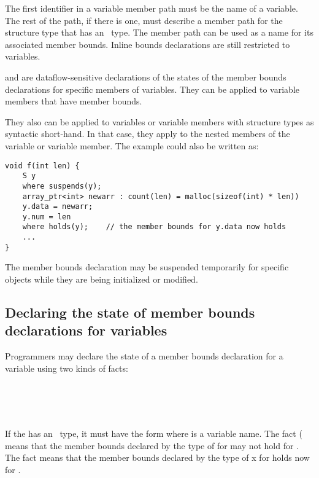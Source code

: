 The first identifier in a variable member path must be the name of a
variable. The rest of the path, if there is one, must
describe a member path for the structure type that has an
\arrayptr\ type. The member path can be used as a name for its
associated member bounds. Inline bounds declarations are still
restricted to variables.

 and  are dataflow-sensitive declarations of 
the states of the member bounds declarations for specific members of variables. They can be
applied to variable members that have member bounds.

They also can be applied to variables or variable members with structure
types as syntactic short-hand. In that case, they apply to the nested
members of the variable or variable member. The example could also be
written as:

\begin{lstlisting}
void f(int len) {
    S y 
    where suspends(y);
    array_ptr<int> newarr : count(len) = malloc(sizeof(int) * len))
    y.data = newarr;
    y.num = len
    where holds(y);    // the member bounds for y.data now holds
    ...
}
\end{lstlisting}

The member bounds
declaration may be suspended temporarily for specific objects while they are being
initialized or modified.

\subsection{Declaring the state of member bounds declarations for variables}

Programmers may declare the state of a member bounds declaration
for a variable using two kinds of facts:
\begin{tabbing}
\= \\
\> \var{\ldots{}} \\
\> \code{)} \\
\> \code{)}
\end{tabbing}

If the  has an \arrayptr\ type, it must
have the form  where  is a variable name. 
The fact (\code{)} means that the
member bounds declared by the type of  for  may not
hold for . The fact \code{)}
means that the member bounds declared by the type of x for 
holds now for .

